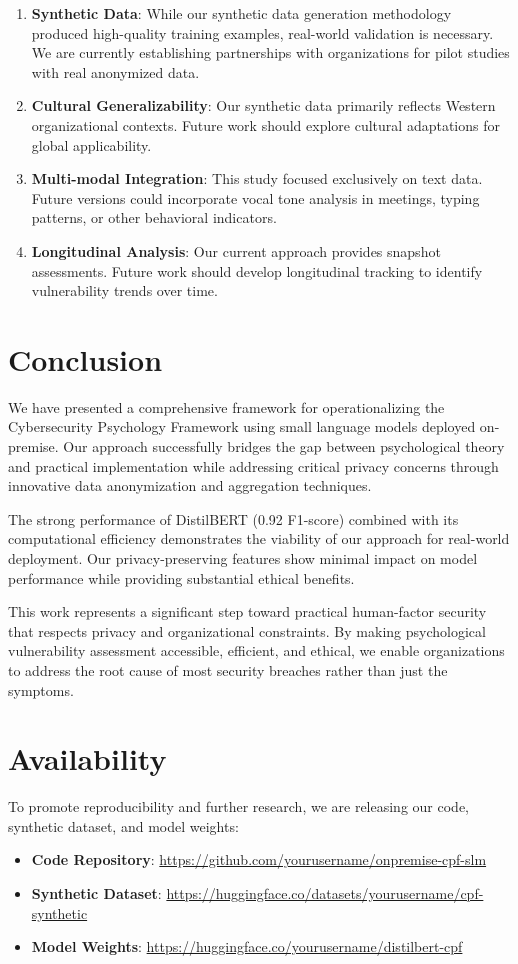 \documentclass[11pt,a4paper]{article}
\begin{document}
\begin{enumerate}
    \item \textbf{Synthetic Data}: While our synthetic data generation methodology produced high-quality training examples, real-world validation is necessary. We are currently establishing partnerships with organizations for pilot studies with real anonymized data.
    \item \textbf{Cultural Generalizability}: Our synthetic data primarily reflects Western organizational contexts. Future work should explore cultural adaptations for global applicability.
    \item \textbf{Multi-modal Integration}: This study focused exclusively on text data. Future versions could incorporate vocal tone analysis in meetings, typing patterns, or other behavioral indicators.
    \item \textbf{Longitudinal Analysis}: Our current approach provides snapshot assessments. Future work should develop longitudinal tracking to identify vulnerability trends over time.
\end{enumerate}

\section{Conclusion}
We have presented a comprehensive framework for operationalizing the Cybersecurity Psychology Framework using small language models deployed on-premise. Our approach successfully bridges the gap between psychological theory and practical implementation while addressing critical privacy concerns through innovative data anonymization and aggregation techniques.

The strong performance of DistilBERT (0.92 F1-score) combined with its computational efficiency demonstrates the viability of our approach for real-world deployment. Our privacy-preserving features show minimal impact on model performance while providing substantial ethical benefits.

This work represents a significant step toward practical human-factor security that respects privacy and organizational constraints. By making psychological vulnerability assessment accessible, efficient, and ethical, we enable organizations to address the root cause of most security breaches rather than just the symptoms.

\section*{Availability}
To promote reproducibility and further research, we are releasing our code, synthetic dataset, and model weights:
\begin{itemize}
    \item \textbf{Code Repository}: \url{https://github.com/yourusername/onpremise-cpf-slm}
    \item \textbf{Synthetic Dataset}: \url{https://huggingface.co/datasets/yourusername/cpf-synthetic}
    \item \textbf{Model Weights}: \url{https://huggingface.co/yourusername/distilbert-cpf}
\end{itemize}
\end{document}
